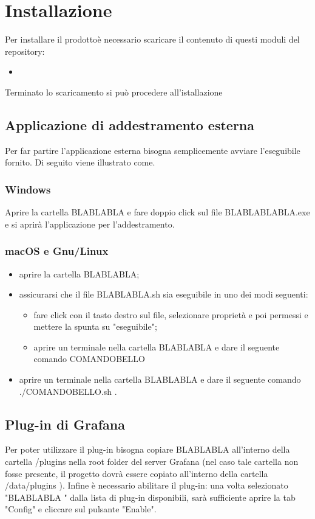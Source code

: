 \section{Installazione}
Per installare il prodotto\glosp è necessario scaricare il contenuto di questi moduli del repository:
\begin{itemize}
	\item 
\end{itemize}
Terminato lo scaricamento si può procedere all'istallazione

\subsection{Applicazione di addestramento esterna}
Per far partire l'applicazione esterna bisogna semplicemente avviare l'eseguibile fornito. Di seguito viene illustrato come.
	\subsubsection{Windows}
	Aprire la cartella BLABLABLA e fare doppio click sul file BLABLABLABLA.exe e si aprirà l'applicazione per l'addestramento.

	\subsubsection{macOS e Gnu/Linux}
	\begin{itemize}
		\item aprire la cartella BLABLABLA;
		\item assicurarsi che il file BLABLABLA.sh sia eseguibile in uno dei modi seguenti:
		\begin{itemize}
			\item fare click con il tasto destro sul file, selezionare proprietà e poi permessi e mettere la spunta su "eseguibile";
			\item aprire un terminale nella cartella BLABLABLA e dare il seguente comando COMANDOBELLO
		\end{itemize}
		\item aprire un terminale nella cartella BLABLABLA e dare il seguente comando ./COMANDOBELLO.sh .
	\end{itemize}

\subsection{Plug-in di Grafana}
Per poter utilizzare il plug-in bisogna copiare BLABLABLA all'interno della cartella /plugins nella root folder del server Grafana (nel caso tale cartella non fosse presente, il progetto dovrà essere copiato all'interno della cartella /data/plugins ). Infine è necessario abilitare il plug-in: una volta selezionato "BLABLABLA " dalla lista di plug-in disponibili, sarà sufficiente aprire la tab "Config" e cliccare sul pulsante "Enable".

